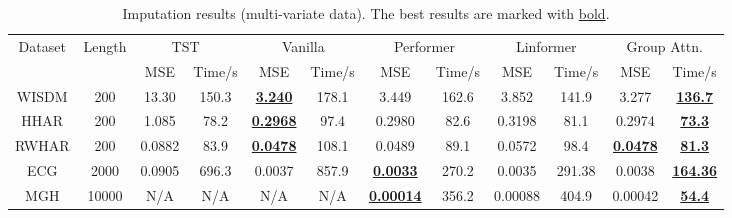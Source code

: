 \begin{table}[t]
\vspace{-2mm}
\centering
\footnotesize
\begin{tabular}{cc|cc|cc|cc|cc|cc}
\toprule
\multirow{2}{*}{Dataset} &  \multirow{2}{*}{Length} &
\multicolumn{2}{c}{TST~\cite{DBLP:conf/kdd/ZerveasJPBE21}}& \multicolumn{2}{c}{Vanilla} & \multicolumn{2}{c}{Performer} & \multicolumn{2}{c}{Linformer} & \multicolumn{2}{c}{Group Attn.}\\
 \cline{3-12}
 &   &  MSE & Time/s & MSE & Time/s  & MSE & Time/s  & MSE & Time/s  & MSE & Time/s \\
 \hline
 WISDM & 200 & 13.30 & 150.3 & \underline{\textbf{3.240}} & 178.1 & 3.449 & 162.6 & 3.852 & 141.9 & 3.277 & \underline{\textbf{136.7}}  \\
 HHAR & 200 & 1.085 & 78.2 &  \underline{\textbf{0.2968}} &  97.4 & 0.2980 & 82.6 & 0.3198 & 81.1 & 0.2974 & \underline{\textbf{73.3}} \\
 RWHAR & 200 & 0.0882 & 83.9 & \underline{\textbf{0.0478}} & 108.1 & 0.0489 & 89.1 & 0.0572 & 98.4 & \underline{\textbf{0.0478}} & \underline{\textbf{81.3}}\\
  ECG & 2000 & 0.0905 &	696.3 &	0.0037	& 857.9 & 	\underline{\textbf{0.0033}} &	270.2 &	0.0035 &	291.38 &	0.0038 &	\underline{\textbf{164.36}}\\
 MGH  & 10000 & N/A & N/A & N/A & N/A & \underline{\textbf{0.00014}} & 356.2 & 0.00088 & 404.9 & 0.00042 & \underline{\textbf{54.4}} \\
 \bottomrule
\end{tabular}
\caption{Imputation results (multi-variate data). The best results are marked with \underline{bold}.}
\label{tab.imputationMulti}
\vspace{-5mm}
\end{table}



















